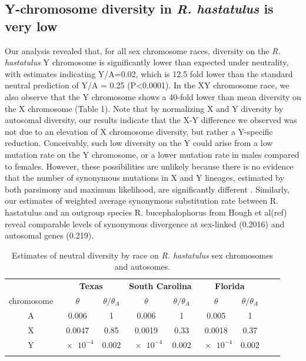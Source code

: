\documentclass[9pt,twocolumn,twoside]{gsajnl}
\begin{document}
\subsection*{Y-chromosome diversity in \textit{R. hastatulus} is very low}
Our analysis revealed that, for all sex chromosome races, diversity on the \textit{R. hastatulus} Y chromosome is significantly lower than expected under neutrality, with estimates indicating Y/A=0.02, which is 12.5 fold lower than the standard neutral prediction of Y/A = 0.25 (P<0.0001). In the XY chromosome race, we also observe that the Y chromosome shows a 40-fold lower than mean diversity on the X chromosome (Table 1). Note that by normalizing X and Y diversity by autosomal diversity, our results indicate that the X-Y difference we observed was not due to an elevation of X chromosome diversity, but rather a Y-specific reduction. Conceivably, such low diversity on the Y could arise from a low mutation rate on the Y chromosome, or a lower mutation rate in males compared to females. However, these possibilities are unlikely because there is no evidence that the number of synonymous mutations in X and Y lineages, estimated by both parsimony and maximum likelihood, are significantly different \citep{hough2014}. Similarly, our estimates of weighted average synonymous substitution rate between R. hastatulus and an outgroup species R. bucephalophorus from Hough et al(ref) reveal comparable levels of synonymous divergence at sex-linked (0.2016) and autosomal genes (0.219).

\begin{table}[t!]
\centering
\caption{Estimates of neutral diversity by race on \textit{R. hastatulus} sex chromosomes and autosomes.}
\begin{tabular}{ccccccccc}
\textbf{} & \multicolumn{2}{c}{\textbf{Texas}} & \multicolumn{2}{c}{\textbf{South Carolina}} & \multicolumn{2}{c}{\textbf{Florida}} \\
chromosome & $\theta$ & $\theta/\theta_{A}$ & $\theta$ & $\theta/\theta_{A}$ & $\theta$ & $\theta/\theta_{A}$ \\
\midrule
A & 0.006 & 1 & 0.006 & 1 & 0.005 & 1 \\
X & 0.0047 & 0.85 & 0.0019 & 0.33 & 0.0018 & 0.37 \\
Y & $\num{e-4}$ & 0.002 & $\num{e-4}$ & 0.002 & $\num{e-4}$ & 0.002 \\
\addlinespace

\bottomrule
\end{tabular}
\end{table}
\end{document}
